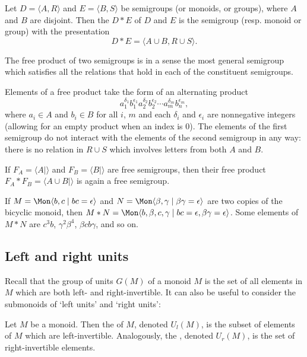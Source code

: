 \documentclass[noindex,noinsetproof,12pt]{lmaths}
\begin{document}
\begin{defn}
Let $D = \langle A, R \rangle$ and $E = \langle B, S \rangle$ be semigroups (or monoids, or groups), where $A$ and $B$ are disjoint. Then the  $D \ast E$ of $D$ and $E$ is the semigroup (resp. monoid or group) with the presentation
	\[ D \ast E = \langle A \cup B, R \cup S \rangle. \]
\end{defn}

The free product of two semigroups is in a sense the most general semigroup which satisfies all the relations that hold in each of the constituent semigroups.

Elements of a free product take the form of an alternating product
	\[ a_1^{\delta_1} b_1^{\epsilon_1} a_2^{\delta_2} b_2^{\epsilon_2} \cdots a_m^{\delta_m} b_n^{\epsilon_m}, \]
where $a_i \in A$ and $b_i \in B$ for all $i$, $m$ and each $\delta_i$ and $\epsilon_i$ are nonnegative integers (allowing for an empty product when an index is 0). The elements of the first semigroup do not interact with the elements of the second semigroup in any way: there is no relation in $R \cup S$ which involves letters from both $A$ and $B$.

\begin{example}
	If $F_A = \langle A \mid \rangle$ and $F_B = \langle B \mid \rangle$ are free semigroups, then their free product $F_A \ast F_B = \langle A \cup B \mid \rangle$ is again a free semigroup.
\end{example}

\begin{example}
	If $M = \Mon \langle b, c \mid bc = \epsilon \rangle$ and $N = \Mon \langle \beta, \gamma \mid \beta\gamma = \epsilon \rangle$ are two copies of the bicyclic monoid, then $M \ast N = \Mon \langle b, \beta, c, \gamma \mid bc = \epsilon, \beta\gamma = \epsilon \rangle$. Some elements of $M \ast N$ are $c^3 b$, $\gamma^2\beta^4$, $\beta c b \gamma$, and so on.
\end{example}


\subsection{Left and right units}

Recall that the group of units $G(M)$ of a monoid $M$ is the set of all elements in $M$ which are both left- and right-invertible. It can also be useful to consider the submonoids of `left units' and `right units':

\begin{defn}
	Let $M$ be a monoid. Then the  of $M$, denoted $U_l(M)$, is the subset of elements of $M$ which are left-invertible. Analogously, the , denoted $U_r(M)$, is the set of right-invertible elements.
\end{defn}
\end{document}
